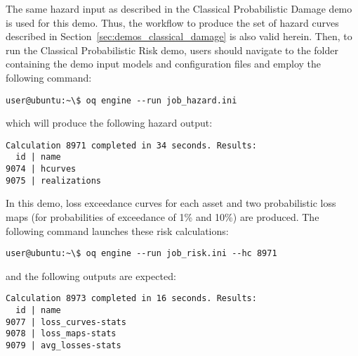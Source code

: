 The same hazard input as described in the Classical Probabilistic Damage demo
is used for this demo. Thus, the workflow to produce the set of hazard curves
described in Section~\ref{sec:demos_classical_damage} is also valid herein.
Then, to run the Classical Probabilistic Risk demo, users should navigate to
the folder containing the demo input models and configuration files and employ
the following command:

\begin{verbatim}
user@ubuntu:~\$ oq engine --run job_hazard.ini
\end{verbatim}

which will produce the following hazard output:

\begin{verbatim}
Calculation 8971 completed in 34 seconds. Results:
  id | name
9074 | hcurves
9075 | realizations
\end{verbatim}

In this demo, loss exceedance curves for each asset and two probabilistic loss
maps (for probabilities of exceedance of 1\% and 10\%) are produced. The
following command launches these risk calculations:

\begin{verbatim}
user@ubuntu:~\$ oq engine --run job_risk.ini --hc 8971
\end{verbatim}

and the following outputs are expected:

\begin{verbatim}
Calculation 8973 completed in 16 seconds. Results:
  id | name
9077 | loss_curves-stats
9078 | loss_maps-stats
9079 | avg_losses-stats
\end{verbatim}
